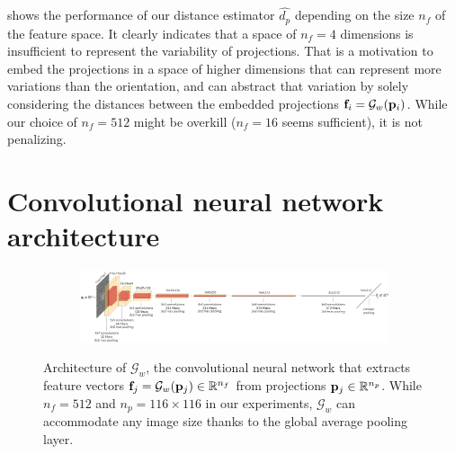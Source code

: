  shows the performance of our distance estimator $\widehat{d_p}$ depending on the size $n_f$ of the feature space.
It clearly indicates that a space of $n_f=4$ dimensions is insufficient to represent the variability of projections.
That is a motivation to embed the projections in a space of higher dimensions that can represent more variations than the orientation, and can abstract that variation by solely considering the distances between the embedded projections $\mathbf{f}_i = \mathcal{G}_w(\mathbf{p}_i)$.
While our choice of $n_f=512$ might be overkill ($n_f=16$ seems sufficient), it is not penalizing.

\newpage
\section{Convolutional neural network architecture}\label{apx:siamese-architecture}

\begin{figure}[ht!]
    \centering
    \begin{subfigure}[t]{1.0\linewidth}
        \includegraphics[width=\linewidth]{figures/architecture2.pdf}
    \end{subfigure}
    \caption{%
        Architecture of $\mathcal{G}_w$, the convolutional neural network that extracts feature vectors $\mathbf{f}_j = \mathcal{G}_w(\mathbf{p}_j) \in \mathbb{R}^{n_f}$ from projections $\mathbf{p}_j \in \mathbb{R}^{n_p}$.
        While $n_f=512$ and $n_p=116 \times 116$ in our experiments, $\mathcal{G}_w$ can accommodate any image size thanks to the global average pooling layer.
    }\label{fig:de-architecture}
\end{figure}

